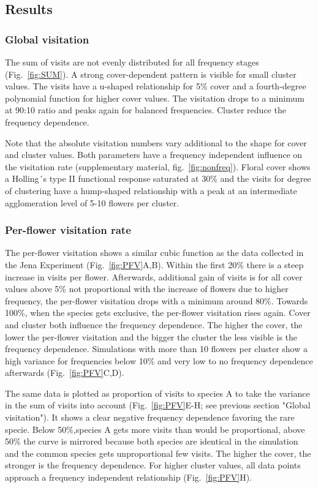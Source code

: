 \label{ch:results_model}

\subsection{Results}

\subsubsection*{Global visitation}
The sum of visits are not evenly distributed for all frequency stages (Fig.~\ref{fig:SUM}). A strong cover-dependent pattern is visible for small cluster values. The visits have a u-shaped relationship for 5\% cover and a fourth-degree polynomial function for higher cover values. The visitation drops to a minimum at 90:10 ratio and peaks again for balanced frequencies. Cluster reduce the frequency dependence. 

Note that the absolute visitation numbers vary additional to the shape for cover and cluster values. Both parameters have a frequency independent influence on the visitation rate (supplementary material, fig.~\ref{fig:nonfreq}). Floral cover shows a Holling´s type II functional response saturated at 30\% and the visits for degree of clustering have a hump-shaped relationship with a peak at an intermediate agglomeration level of 5-10 flowers per cluster.

\subsubsection*{Per-flower visitation rate}
The per-flower visitation shows a similar cubic function as the data collected in the Jena Experiment (Fig.~\ref{fig:PFV}A,B). Within the first 20\% there is a steep increase in visits per flower. Afterwards, additional gain of visits is for all cover values above 5\% not proportional with the increase of flowers due to higher frequency, the per-flower visitation drops with a minimum around 80\%. Towards 100\%, when the species gets exclusive, the per-flower visitation rises again. 
Cover and cluster both influence the frequency dependence. The higher the cover, the lower the per-flower visitation and the bigger the cluster the less visible is the frequency dependence. Simulations with more than 10 flowers per cluster show a high variance for frequencies below 10\% and very low to no frequency dependence afterwards (Fig.~\ref{fig:PFV}C,D). 

The same data is plotted as proportion of visits to species A to take the variance in the sum of visits into account (Fig.~\ref{fig:PFV}E-H; see previous section "Global visitation"). It shows a clear negative frequency dependence favoring the rare specie. Below 50\%,species A gets more visits than would be proportional, above 50\% the curve is mirrored because both species are identical in the simulation and the common species gets unproportional few visits. The higher the cover, the stronger is the frequency dependence. For higher cluster values, all data points approach a frequency independent relationship (Fig.~\ref{fig:PFV}H). 

